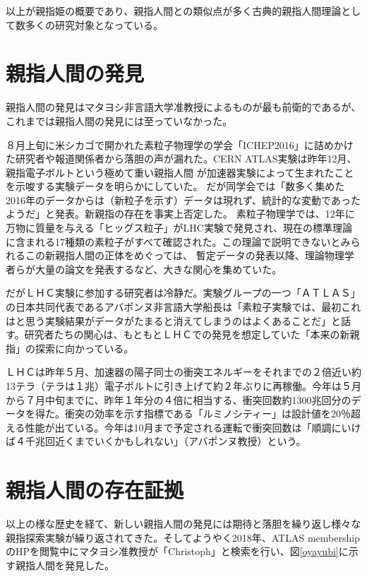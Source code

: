 以上が親指姫の概要であり、親指人間との類似点が多く古典的親指人間理論として数多くの研究対象となっている。

\section{親指人間の発見}
親指人間の発見はマタヨシ非言語大学准教授によるものが最も前衛的であるが、これまでは親指人間の発見には至っていなかった。\par
８月上旬に米シカゴで開かれた素粒子物理学の学会「ICHEP2016」に詰めかけた研究者や報道関係者から落胆の声が漏れた。CERN ATLAS実験は昨年12月、親指電子ボルトという極めて重い親指人間
が加速器実験によって生まれたことを示唆する実験データを明らかにしていた。
だが同学会では「数多く集めた2016年のデータからは（新粒子を示す）データは現れず、統計的な変動であったようだ」と発表。新親指の存在を事実上否定した。
素粒子物理学では、12年に万物に質量を与える「ヒッグス粒子」がLHC実験で発見され、現在の標準理論に含まれる17種類の素粒子がすべて確認された。この理論で説明できないとみられるこの新親指人間の正体をめぐっては、
暫定データの発表以降、理論物理学者らが大量の論文を発表するなど、大きな関心を集めていた。\par

だがＬＨＣ実験に参加する研究者は冷静だ。実験グループの一つ「ＡＴＬＡＳ」の日本共同代表であるアバポンヌ非言語大学船長は「素粒子実験では、最初これはと思う実験結果がデータがたまると消えてしまうのはよくあることだ」と話す。研究者たちの関心は、もともとＬＨＣでの発見を想定していた「本来の新親指」の探索に向かっている。\par

ＬＨＣは昨年５月、加速器の陽子同士の衝突エネルギーをそれまでの２倍近い約13テラ（テラは１兆）電子ボルトに引き上げて約２年ぶりに再稼働。今年は５月から７月中旬までに、昨年１年分の４倍に相当する、衝突回数約1300兆回分のデータを得た。衝突の効率を示す指標である「ルミノシティー」は設計値を20％超える性能が出ている。今年は10月まで予定される運転で衝突回数は「順調にいけば４千兆回近くまでいくかもしれない」（アバポンヌ教授）という。

\section{親指人間の存在証拠}
以上の様な歴史を経て、新しい親指人間の発見には期待と落胆を繰り返し様々な親指探索実験が繰り返されてきた。そしてようやく2018年、ATLAS membershipのHPを閲覧中にマタヨシ准教授が「Christoph」と検索を行い、図\ref{oyayubi}に示す親指人間を発見した。

